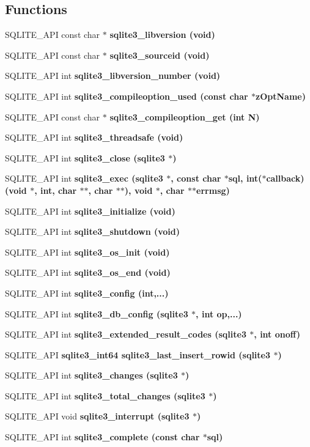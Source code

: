 \subsection*{Functions}
\begin{CompactItemize}
\item 
SQLITE\_\-API const char $\ast$ \bf{sqlite3\_\-libversion} (void)
\item 
SQLITE\_\-API const char $\ast$ \bf{sqlite3\_\-sourceid} (void)
\item 
SQLITE\_\-API int \bf{sqlite3\_\-libversion\_\-number} (void)
\item 
SQLITE\_\-API int \bf{sqlite3\_\-compileoption\_\-used} (const char $\ast$z\-Opt\-Name)
\item 
SQLITE\_\-API const char $\ast$ \bf{sqlite3\_\-compileoption\_\-get} (int N)
\item 
SQLITE\_\-API int \bf{sqlite3\_\-threadsafe} (void)
\item 
SQLITE\_\-API int \bf{sqlite3\_\-close} (\bf{sqlite3} $\ast$)
\item 
SQLITE\_\-API int \bf{sqlite3\_\-exec} (\bf{sqlite3} $\ast$, const char $\ast$sql, int($\ast$callback)(void $\ast$, int, char $\ast$$\ast$, char $\ast$$\ast$), void $\ast$, char $\ast$$\ast$errmsg)
\item 
SQLITE\_\-API int \bf{sqlite3\_\-initialize} (void)
\item 
SQLITE\_\-API int \bf{sqlite3\_\-shutdown} (void)
\item 
SQLITE\_\-API int \bf{sqlite3\_\-os\_\-init} (void)
\item 
SQLITE\_\-API int \bf{sqlite3\_\-os\_\-end} (void)
\item 
SQLITE\_\-API int \bf{sqlite3\_\-config} (int,...)
\item 
SQLITE\_\-API int \bf{sqlite3\_\-db\_\-config} (\bf{sqlite3} $\ast$, int op,...)
\item 
SQLITE\_\-API int \bf{sqlite3\_\-extended\_\-result\_\-codes} (\bf{sqlite3} $\ast$, int onoff)
\item 
SQLITE\_\-API \bf{sqlite3\_\-int64} \bf{sqlite3\_\-last\_\-insert\_\-rowid} (\bf{sqlite3} $\ast$)
\item 
SQLITE\_\-API int \bf{sqlite3\_\-changes} (\bf{sqlite3} $\ast$)
\item 
SQLITE\_\-API int \bf{sqlite3\_\-total\_\-changes} (\bf{sqlite3} $\ast$)
\item 
SQLITE\_\-API void \bf{sqlite3\_\-interrupt} (\bf{sqlite3} $\ast$)
\item 
SQLITE\_\-API int \bf{sqlite3\_\-complete} (const char $\ast$sql)
$$
\end{CompactItemize}
